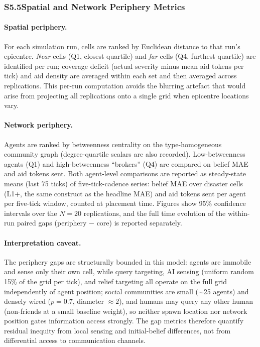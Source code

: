 \subsubsection*{S5.5\enspace Spatial and Network Periphery Metrics}

\paragraph{Spatial periphery.}
For each simulation run, cells are ranked by Euclidean distance to that run's
epicentre.
\emph{Near} cells (Q1, closest quartile) and \emph{far} cells (Q4, furthest
quartile) are identified per run; coverage deficit (actual severity minus mean
aid tokens per tick) and aid density are averaged within each set and then
averaged across replications.
This per-run computation avoids the blurring artefact that would arise from
projecting all replications onto a single grid when epicentre locations vary.

\paragraph{Network periphery.}
Agents are ranked by betweenness centrality on the type-homogeneous community
graph (degree-quartile scalars are also recorded).
Low-betweenness agents (Q1) and high-betweenness ``brokers'' (Q4) are compared
on belief MAE and aid tokens sent.
Both agent-level comparisons are reported as steady-state means (last 75 ticks)
of five-tick-cadence series: belief MAE over disaster cells (L1+, the same
construct as the headline MAE) and aid tokens sent per agent per five-tick
window, counted at placement time.
Figures show 95\% confidence intervals over the $N=20$ replications, and the
full time evolution of the within-run paired gaps (periphery $-$ core) is
reported separately.

\paragraph{Interpretation caveat.}
The periphery gaps are structurally bounded in this model: agents are immobile
and sense only their own cell, while query targeting, AI sensing (uniform
random 15\% of the grid per tick), and relief targeting all operate on the full
grid independently of agent position; social communities are small
($\sim$25 agents) and densely wired ($p=0.7$, diameter $\approx 2$), and humans
may query any other human (non-friends at a small baseline weight), so neither
spawn location nor network position gates information access strongly.
The gap metrics therefore quantify residual inequity from local sensing and
initial-belief differences, not from differential access to communication
channels.

